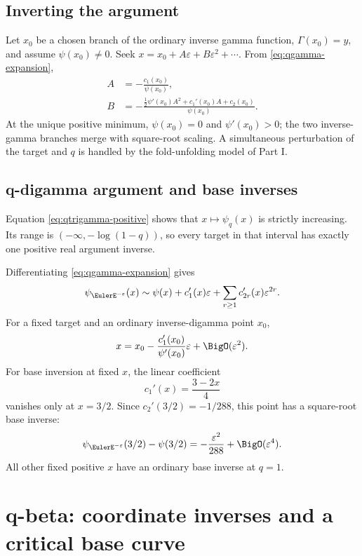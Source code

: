 \documentclass[11pt,letterpaper,oneside,openany]{book}
\theoremstyle{definition}
\theoremstyle{remark}
\begin{document}
\section{Inverting the argument}
Let \(x_0\) be a chosen branch of the ordinary inverse gamma function,
\(\Gamma(x_0)=y\), and assume \(\psi(x_0)\ne0\).  Seek
\(x=x_0+A\varepsilon+B\varepsilon^2+\cdots\).  From
\cref{eq:qgamma-expansion},
\begin{align}
 A&=-\frac{c_1(x_0)}{\psi(x_0)}, \label{eq:qgamma-x-A}\\
 B&=-\frac{
 \frac12\psi'(x_0)A^2+c_1'(x_0)A+c_2(x_0)}{\psi(x_0)}.
 \label{eq:qgamma-x-B}
\end{align}
At the unique positive minimum, \(\psi(x_0)=0\) and
\(\psi'(x_0)>0\); the two inverse-gamma branches merge with square-root
scaling.  A simultaneous perturbation of the target and \(q\) is handled by
the fold-unfolding model of Part I.

\section{q-digamma argument and base inverses}
Equation \cref{eq:qtrigamma-positive} shows that
\(x\mapsto\psi_q(x)\) is strictly increasing.  Its range is
\(( -\infty,-\log(1-q))\), so every target in that interval has exactly one
positive real argument inverse.

Differentiating \cref{eq:qgamma-expansion} gives
\begin{equation}
 \psi_{\EulerE^{-\varepsilon}}(x)
 \sim\psi(x)+c_1'(x)\varepsilon+
 \sum_{r\ge1}c_{2r}'(x)\varepsilon^{2r}.
 \label{eq:qdigamma-q1}
\end{equation}
For a fixed target and an ordinary inverse-digamma point \(x_0\),
\[
 x=x_0-\frac{c_1'(x_0)}{\psi'(x_0)}\varepsilon+\BigO(\varepsilon^2).
\]
For base inversion at fixed \(x\), the linear coefficient
\[
 c_1'(x)=\frac{3-2x}{4}
\]
vanishes only at \(x=3/2\).  Since
\(c_2'(3/2)=-1/288\), this point has a square-root base inverse:
\begin{equation}
 \psi_{\EulerE^{-\varepsilon}}(3/2)-\psi(3/2)
 =-\frac{\varepsilon^2}{288}+\BigO(\varepsilon^4).
 \label{eq:qdigamma-critical}
\end{equation}
All other fixed positive \(x\) have an ordinary base inverse at \(q=1\).

\chapter{q-beta: coordinate inverses and a critical base curve}
\end{document}
